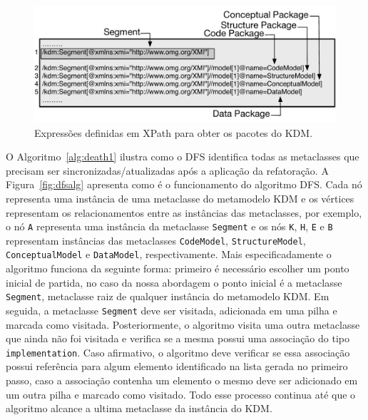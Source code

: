 \begin{figure}[h]
	\centering
	\caption{Expressões definidas em XPath para obter os pacotes do KDM.}
	\label{fig:xpath_queries}
	\includegraphics[scale=0.68]{images/queiresANDATLSBESNew}
	\fautor
\end{figure}

O Algoritmo~\ref{alg:death1} ilustra como o DFS identifica todas as metaclasses que precisam ser sincronizadas/atualizadas após a aplicação da refatoração. A Figura~\ref{fig:dfsalg} apresenta como é o funcionamento do algoritmo DFS. Cada nó representa uma instância de uma metaclasse do metamodelo KDM e os vértices representam os relacionamentos entre as instâncias das metaclasses, por exemplo, o nó \texttt{A} representa uma instância da metaclasse \texttt{Segment} e os nós \texttt{K}, \texttt{H}, \texttt{E} e \texttt{B} representam instâncias das metaclasses \texttt{CodeModel}, \texttt{StructureModel}, \texttt{ConceptualModel} e \texttt{DataModel}, respectivamente. Mais especificadamente o algoritmo funciona da seguinte forma: primeiro é necessário escolher um ponto inicial de partida, no caso da nossa abordagem o ponto inicial é a metaclasse \texttt{Segment}, metaclasse raiz de qualquer instância do metamodelo KDM. Em seguida, a metaclasse \texttt{Segment} deve ser visitada, adicionada em uma pilha e marcada como visitada. Posteriormente, o algoritmo visita uma outra metaclasse que ainda não foi visitada e verifica se a mesma possui uma associação do tipo \texttt{implementation}. Caso afirmativo, o algoritmo deve verificar se essa associação possui referência para algum elemento identificado na lista gerada no primeiro passo, caso a associação contenha um elemento o mesmo deve ser adicionado em um outra pilha e marcado como visitado. Todo esse processo continua até que o algoritmo alcance a ultima metaclasse da instância do KDM. 



